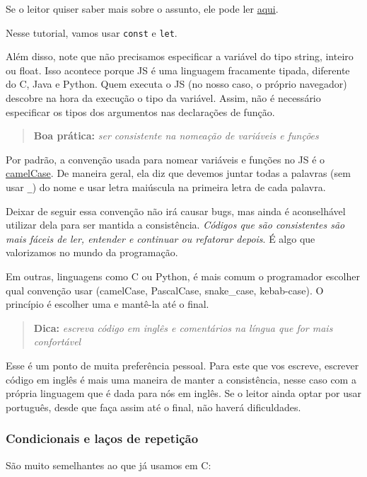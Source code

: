 Se o leitor quiser saber mais sobre o assunto, ele pode ler \href{https://www.alura.com.br/artigos/entenda-diferenca-entre-var-let-e-const-no-javascript}{aqui}.

Nesse tutorial, vamos usar \texttt{const} e \texttt{let}.

Além disso, note que não precisamos especificar a variável do tipo
string, inteiro ou float. Isso acontece porque JS é uma linguagem
fracamente tipada, diferente do C, Java e Python. Quem executa o JS
(no nosso caso,  o próprio navegador) descobre na hora da execução o 
tipo da variável. Assim, não é necessário especificar os tipos dos 
argumentos nas declarações de função.

\begin{quote}
\textbf{Boa prática:} \textit{ser consistente na nomeação de variáveis e funções}
\end{quote}

Por padrão, a convenção usada para nomear variáveis e funções no JS é o
\href{https://en.wikipedia.org/wiki/Camel_case}{camelCase}. De maneira
geral, ela diz que devemos juntar todas a palavras (sem usar
\texttt{\_}) do nome e usar letra maiúscula na primeira letra de cada
palavra.

Deixar de seguir essa convenção não irá causar bugs, mas ainda é
aconselhável utilizar dela para ser mantida a consistência.
\emph{Códigos que são consistentes são mais fáceis de ler, entender e
continuar ou refatorar depois}. É algo que valorizamos no mundo da programação.

Em outras, linguagens como C ou Python, é mais comum o programador
escolher qual convenção usar (camelCase, PascalCase, snake\_case,
kebab-case). O princípio é escolher uma e mantê-la até o final.

\begin{quote}
\textbf{Dica:} \textit{escreva código em inglês e comentários na língua que for
mais confortável}
\end{quote}

Esse é um ponto de muita preferência pessoal. Para este que vos escreve,
escrever código em inglês é mais uma maneira de manter a consistência,
nesse caso com a própria linguagem que é dada para nós em inglês. Se o
leitor ainda optar por usar português, desde que faça assim até o final,
não haverá dificuldades.

\subsubsection{Condicionais e laços de repetição}
São muito semelhantes ao que já usamos em C:


